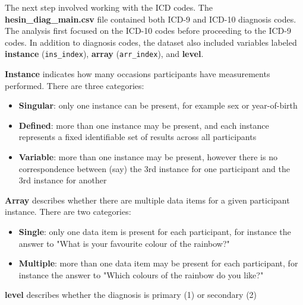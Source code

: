 \documentclass[11pt]{article}
\newcounter{subsubsubsection}[subsubsection]
\begin{document}
The next step involved working with the ICD codes. The \textbf{hesin\_diag\_main.csv} file contained both ICD-9 and ICD-10 diagnosis codes. The analysis first focused on the ICD-10 codes before proceeding to the ICD-9 codes. In addition to diagnosis codes, the dataset also included variables labeled \textbf{instance} (\texttt{ins\_index}), \textbf{array} (\texttt{arr\_index}), and \textbf{level}.

 
\textbf{Instance} indicates how many occasions participants have measurements performed. There are three categories: 
\begin{itemize}
\item \textbf{Singular}: only one instance can be present, for example sex or year-of-birth
\item \textbf{Defined}: more than one instance may be present, and each instance represents a fixed identifiable set of results across all participants
\item \textbf{Variable}: more than one instance may be present, however there is no correspondence between (say) the 3rd instance for one participant and the 3rd instance for another 
\end{itemize}
\textbf{Array} describes whether there are multiple data items for a given participant instance. There are two categories:
\begin{itemize}
\item \textbf{Single}:  only one data item is present for each participant, for instance the answer to "What is your favourite colour of the rainbow?" 
\item \textbf{Multiple}: more than one data item may be present for each participant, for instance the answer to "Which colours of the rainbow do you like?"
\end{itemize}
\textbf{level} describes whether the diagnosis is primary (1) or secondary (2) \\

\end{document}
